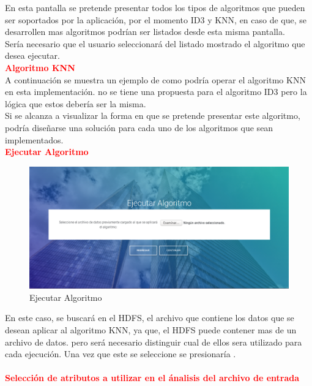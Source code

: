 En esta pantalla se pretende presentar todos los tipos de algoritmos que pueden ser soportados por la aplicación, por el momento ID3 y KNN, en caso de que, se desarrollen mas algoritmos podrían ser listados desde esta misma pantalla.\\
Sería necesario que el usuario seleccionará del listado mostrado el algoritmo que desea ejecutar.\\
\textbf{\textcolor{red}{Algoritmo KNN}}
\\
A continuación se muestra un ejemplo de como podría operar el algoritmo KNN en esta implementación. no se tiene una propuesta para el algoritmo ID3 pero la lógica que estos debería ser la misma.\\
Si se alcanza a visualizar la forma en que se pretende presentar este algoritmo, podría diseñarse una solución para cada uno de los algoritmos que sean implementados.\\
\textbf{\textcolor{red}{Ejecutar Algoritmo}}
\\
\begin{figure}[H]
	\hypertarget{fig:red}{\hspace{1pt}}
	\begin{center}
		\includegraphics[width=.9\textwidth]{capitulo7/images/seleccione.png}
		\caption{Ejecutar Algoritmo}
		\label{fig:seleccione}
	\end{center}
\end{figure}
En este caso, se buscará en el HDFS, el archivo que contiene los datos que se desean aplicar al algoritmo KNN, ya que, el HDFS puede contener mas de un archivo de datos. pero será necesario distinguir cual de ellos sera utilizado para cada ejecución. 
Una vez que este se seleccione se presionaría .\\
\\
\textbf{\textcolor{red}{Selección de atributos a utilizar en el ánalisis del archivo de entrada}}
